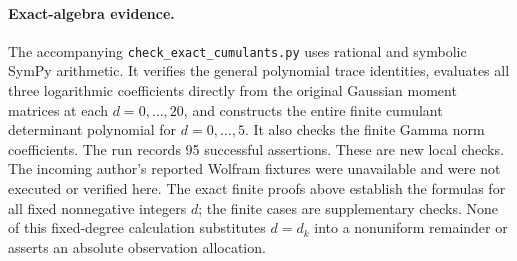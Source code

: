 \paragraph{Exact-algebra evidence.}
The accompanying \texttt{check\_exact\_cumulants.py} uses rational and
symbolic SymPy arithmetic. It verifies the general polynomial trace
identities, evaluates all three logarithmic coefficients directly from
the original Gaussian moment matrices at each \(d=0,\ldots,20\), and
constructs the entire finite cumulant determinant polynomial for
\(d=0,\ldots,5\). It also checks the finite Gamma norm coefficients.
The run records 95 successful assertions. These are new local checks.
The incoming author's reported Wolfram fixtures were unavailable and
were not executed or verified here. The exact finite proofs above
establish the formulas for all fixed nonnegative integers \(d\);
the finite cases are supplementary checks. None of this fixed-degree
calculation substitutes \(d=d_k\) into a nonuniform remainder or
asserts an absolute observation allocation.
